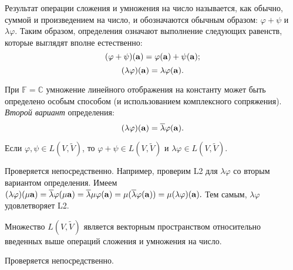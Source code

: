 


Результат операции сложения и умножения на число называется, как обычно, суммой и произведением на
число,  и обозначаются обычным образом:
$\varphi  + \psi $ и $\lambda \varphi$. Таким образом, определения означают выполнение 
следующих равенств, которые выглядят вполне естественно:
$$(\varphi  + \psi) (\mathbf{a}) = \varphi (\mathbf{a}) + \psi  (\mathbf{a});$$
$$ (\lambda \varphi) (\mathbf{a}) = \lambda \varphi (\mathbf{a}).$$ 


При $\mathbb{F} = \mathbb{C}$ умножение линейного отображения на константу может быть определено
особым способом (и использованием комплексного сопряжения). {\it Второй вариант} определения: 
$$(\lambda \varphi) (\mathbf{a}) = \overline{\lambda} \varphi (\mathbf{a}).$$


\begin{predl}\label{p8_1_4}
Если $\varphi, \psi \in L(V, \widetilde{V})$, то
$\varphi + \psi \in L(V, \widetilde{V})$ и
$\lambda \varphi \in L(V, \widetilde{V})$.
\end{predl}
\dok Проверяется непосредственно. Например, проверим L2 для $\lambda \varphi$ со вторым вариантом определения.
Имеем $(\lambda \varphi)(\mu \mathbf{a}) = \overline{\lambda} \varphi(\mu \mathbf{a}) =  \overline{\lambda} \mu  \varphi(\mathbf{a}) =
\mu (\overline{\lambda}   \varphi(\mathbf{a})) = \mu (\lambda   \varphi)(\mathbf{a}).$ Тем самым, $\lambda \varphi$ удовлетворяет L2.
\edok

\begin{predl}\label{p8_1_5}
Множество $L(V, \widetilde{V})$ является векторным пространством относительно
введенных выше операций сложения и умножения на число. 
\end{predl}
\dok Проверяется непосредственно. 
\edok

